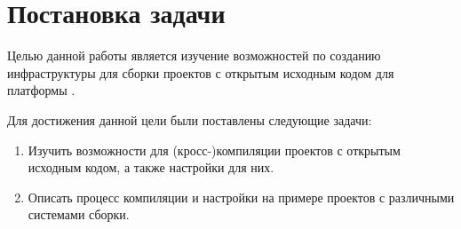 
\section{Постановка задачи}
\label{sec:task}

Целью данной работы является изучение возможностей по созданию инфраструктуры для сборки проектов с открытым исходным кодом для платформы \riscv{}.

Для достижения данной цели были поставлены следующие задачи:
\begin{enumerate}
	\item Изучить возможности для (кросс-)компиляции проектов с открытым исходным кодом, а также настройки \ci{} для них.
	\item Описать процесс компиляции и настройки \ci{} на примере проектов с различными системами сборки.
\end{enumerate}

